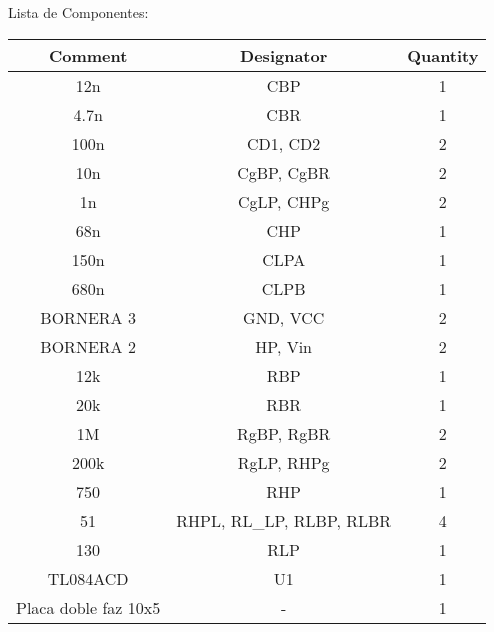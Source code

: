 \documentclass[a4paper]{article}
\begin{document}
\center
Lista de Componentes:


\begin{table}[htb]
\begin{tabular}{|c|c|c|}
\hline
\textbf{Comment} & \textbf{Designator} & \textbf{Quantity} \\ \hline
12n & CBP & 1 \\ \hline
4.7n & CBR & 1 \\ \hline
100n & CD1, CD2 & 2 \\ \hline
10n & CgBP, CgBR & 2 \\ \hline
1n & CgLP, CHPg & 2 \\ \hline
68n & CHP & 1 \\ \hline
150n & CLPA & 1 \\ \hline
680n & CLPB & 1 \\ \hline
BORNERA 3 & GND, VCC & 2 \\ \hline
BORNERA 2 & HP, Vin & 2 \\ \hline
12k & RBP & 1 \\ \hline
20k & RBR & 1 \\ \hline
1M & RgBP, RgBR & 2 \\ \hline
200k & RgLP, RHPg & 2 \\ \hline
750 & RHP & 1 \\ \hline
51 & RHPL, RL\_LP, RLBP, RLBR & 4 \\ \hline
130 & RLP & 1 \\ \hline
TL084ACD & U1 & 1 \\ \hline
Placa doble faz 10x5 & - & 1 \\ \hline
\end{tabular}
\end{table}
\end{document}
